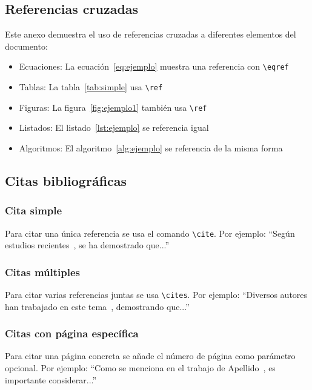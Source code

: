 \documentclass[a4paper,11pt]{report}
\begin{document}
\begin{appendices}
\subsection{Referencias cruzadas}

Este anexo demuestra el uso de referencias cruzadas a diferentes elementos del documento:

\begin{itemize}
  \item Ecuaciones: La ecuación~\eqref{eq:ejemplo} muestra una referencia con \texttt{\textbackslash eqref}
  \item Tablas: La tabla~\ref{tab:simple} usa \texttt{\textbackslash ref}
  \item Figuras: La figura~\ref{fig:ejemplo1} también usa \texttt{\textbackslash ref}
  \item Listados: El listado~\ref{lst:ejemplo} se referencia igual
  \item Algoritmos: El algoritmo~\ref{alg:ejemplo} se referencia de la misma forma
\end{itemize}

\subsection{Citas bibliográficas}

\subsubsection{Cita simple}

Para citar una única referencia se usa el comando \texttt{\textbackslash cite}. Por ejemplo: ``Según estudios recientes~\cite{Apellido2020}, se ha demostrado que...''

\subsubsection{Citas múltiples}

Para citar varias referencias juntas se usa \texttt{\textbackslash cites}. Por ejemplo: ``Diversos autores han trabajado en este tema~\cites{Apellido2020,Apellido2021}, demostrando que...''

\subsubsection{Citas con página específica}

Para citar una página concreta se añade el número de página como parámetro opcional. Por ejemplo: ``Como se menciona en el trabajo de Apellido~\cite[][p.~105]{Apellido2021}, es importante considerar...''


\end{appendices}
\end{document}
